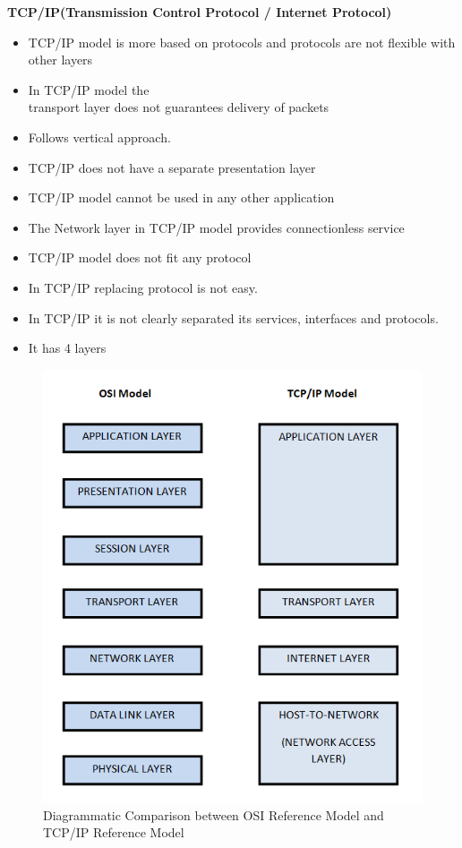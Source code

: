 \documentclass[a4paper,12pt]{report}
\begin{document}
\textbf{TCP/IP(Transmission Control Protocol / Internet Protocol)}

\begin{itemize}
\item TCP/IP model is more based on protocols and protocols are not flexible with other layers
\item In TCP/IP model the \\transport layer does not guarantees delivery of packets
\item Follows vertical approach.
\item TCP/IP does not have a separate presentation layer
\item TCP/IP model cannot be used in any other application
\item The Network layer in TCP/IP model provides connectionless service
\item TCP/IP model does not fit any protocol
\item In TCP/IP replacing protocol is not easy.
\item In TCP/IP it is not clearly separated its services, interfaces and protocols.
\item It has 4 layers
\end{itemize}

\begin{figure}[!htp]
\centering
\includegraphics[scale=0.7]{tcpip_osi_comparison.png}
\caption{Diagrammatic Comparison between OSI Reference Model and TCP/IP Reference Model}
\label{tcpip_osi_comparison}
\end{figure}
\end{document}
